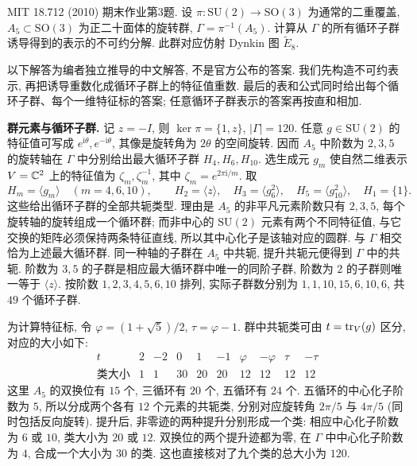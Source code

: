 \begin{exercise}\label{final:3}
MIT 18.712 (2010) 期末作业第3题. 设 $\pi:\mathrm{SU}(2)\to\mathrm{SO}(3)$ 为通常的二重覆盖, $A_5\subset\mathrm{SO}(3)$ 为正二十面体的旋转群, $\Gamma=\pi^{-1}(A_5)$. 计算从 $\Gamma$ 的所有循环子群诱导得到的表示的不可约分解. 此群对应仿射 Dynkin 图 $\widetilde E_8$.
\end{exercise}
\begin{solution}
以下解答为编者独立推导的中文解答, 不是官方公布的答案. 我们先构造不可约表示, 再把诱导重数化成循环子群上的特征值重数. 最后的表和公式同时给出每个循环子群、每个一维特征标的答案; 任意循环子群表示的答案再按直和相加.

\textbf{群元素与循环子群.}
记 $z=-I$, 则 $\ker\pi=\{1,z\}$, $|\Gamma|=120$. 任意 $g\in\mathrm{SU}(2)$ 的特征值可写成 $e^{\mathrm i\theta},e^{-\mathrm i\theta}$, 其像是旋转角为 $2\theta$ 的空间旋转. 因而 $A_5$ 中阶数为 $2,3,5$ 的旋转轴在 $\Gamma$ 中分别给出最大循环子群 $H_4,H_6,H_{10}$. 选生成元 $g_m$ 使自然二维表示 $V=\mathbb C^2$ 上的特征值为 $\zeta_m,\zeta_m^{-1}$, 其中 $\zeta_m=e^{2\pi\mathrm i/m}$. 取
\[
 H_m=\langle g_m\rangle\quad(m=4,6,10),\qquad
 H_2=\langle z\rangle,\quad H_3=\langle g_6^2\rangle,\quad
 H_5=\langle g_{10}^2\rangle,\quad H_1=\{1\}.
\]
这些给出循环子群的全部共轭类型. 理由是 $A_5$ 的非平凡元素阶数只有 $2,3,5$, 每个旋转轴的旋转组成一个循环群; 而非中心的 $\mathrm{SU}(2)$ 元素有两个不同特征值, 与它交换的矩阵必须保持两条特征直线, 所以其中心化子是该轴对应的圆群. 与 $\Gamma$ 相交恰为上述最大循环群. 同一种轴的子群在 $A_5$ 中共轭, 提升共轭元便得到 $\Gamma$ 中的共轭. 阶数为 $3,5$ 的子群是相应最大循环群中唯一的同阶子群, 阶数为 $2$ 的子群则唯一等于 $\langle z\rangle$. 按阶数 $1,2,3,4,5,6,10$ 排列, 实际子群数分别为 $1,1,10,15,6,10,6$, 共 $49$ 个循环子群.

为计算特征标, 令 $\varphi=(1+\sqrt5)/2$, $\tau=\varphi-1$. 群中共轭类可由 $t=\operatorname{tr}_V(g)$ 区分, 对应的大小如下:
\[
\begin{array}{c|rrrrrrrrr}
t&2&-2&0&1&-1&\varphi&-\varphi&\tau&-\tau\\ \hline
\text{类大小}&1&1&30&20&20&12&12&12&12
\end{array}
\]
这里 $A_5$ 的双换位有 $15$ 个, 三循环有 $20$ 个, 五循环有 $24$ 个. 五循环的中心化子阶数为 $5$, 所以分成两个各有 $12$ 个元素的共轭类, 分别对应旋转角 $2\pi/5$ 与 $4\pi/5$ (同时包括反向旋转). 提升后, 非零迹的两种提升分别形成一个类: 相应中心化子阶数为 $6$ 或 $10$, 类大小为 $20$ 或 $12$. 双换位的两个提升迹都为零, 在 $\Gamma$ 中中心化子阶数为 $4$, 合成一个大小为 $30$ 的类. 这也直接核对了九个类的总大小为 $120$.


\end{solution}

